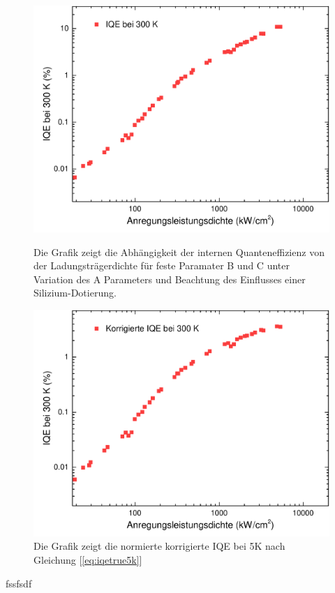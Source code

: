 \begin{figure}[h]
    \centering
    \begin{minipage}[t]{0.49\linewidth}
        \centering
        \includegraphics[width=\linewidth]{Bilder/StandardIQE300K.pdf}
        \caption{Die Grafik zeigt die Abhängigkeit der internen Quanteneffizienz von der Ladungsträgerdichte für feste Paramater B und C unter Variation des A Parameters und Beachtung des Einflusses einer Silizium-Dotierung.}
        \label{fig:standiqe300k}
    \end{minipage}%
    \hfill
    \begin{minipage}[t]{0.49\linewidth}
        \centering
        \includegraphics[width=\linewidth]{Bilder/KorrigierteIQE300K.pdf}
        \caption{Die Grafik zeigt die normierte korrigierte IQE bei 5K nach Gleichung [\ref{eq:iqetrue5k}] }
        \label{fig:trueiqe300k}
    \end{minipage}
\end{figure}
\vspace{1cm}
\raggedright
%
fssfsdf
